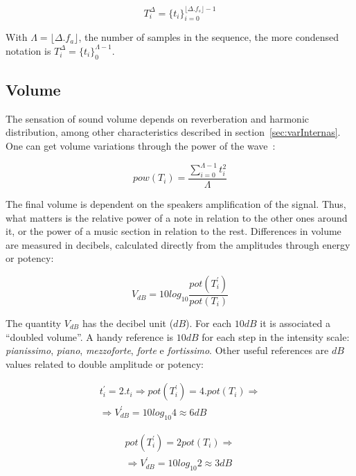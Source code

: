 \begin{equation}\label{eq:dur}
T_{i}^{\Delta}={\{t_i\}}_{i=0}^{\lfloor \Delta . f_s \rfloor -1}
\end{equation}

With $\Lambda=\lfloor \Delta . f_a \rfloor$, the number of samples in the sequence, the more condensed notation is $T_i^\Delta=\{t_i\}_0^{\Lambda-1}$.

\subsection{Volume}\label{subsec:volume}

The sensation of sound volume depends on reverberation and harmonic distribution, among other characteristics described in section~\ref{sec:varInternas}. One can get volume variations through the power of the wave~\cite{Chowning}:

\begin{equation}\label{eq:potencia}
pow(T_i)=\frac{\sum_{i=0}^{\Lambda -1} t_i^2}{\Lambda}
\end{equation} 

The final volume is dependent on the speakers amplification of the signal. Thus, what matters is the relative power of a note in relation to the other ones around it, or the power of a music section in relation to the rest. Differences in volume are measured in decibels, calculated directly from the amplitudes through energy or potency:

\begin{equation}\label{decibels}
V_{dB}=10log_{10}\frac{pot(T^{'}_i)}{pot(T_i)}
\end{equation}

The quantity $V_{dB}$ has the decibel unit ($dB$). 
For each $10dB$ it is associated a ``doubled volume''.
A handy reference is $10dB$ for each step in the intensity scale: \emph{pianissimo}, \emph{piano}, \emph{mezzoforte}, \emph{forte} e \emph{fortissimo}. Other useful references are $dB$ values related to double amplitude or potency:

\begin{equation}\label{eq:ampVol}
\begin{split}
t_i^{'}=2 . t_i \Rightarrow pot(T^{'}_i)=4 . pot(T_i) \Rightarrow \\ \Rightarrow V^{'}_{dB}=10log_{10} 4 \approx 6 dB
\end{split}
\end{equation}

\begin{equation}\label{eq:potVol}
\begin{split}
pot(T^{'}_i)=2 pot(T_i) \Rightarrow \\ \Rightarrow V^{'}_{dB}=10log_{10} 2 \approx 3 dB
\end{split}
\end{equation}

